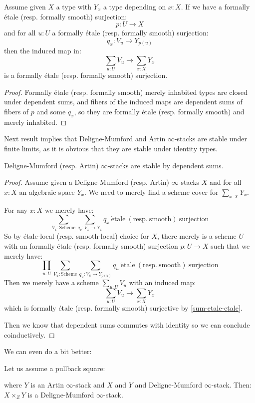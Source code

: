 \begin{lemma}\label{sum-etale-etale}
Assume given $X$ a type with $Y_x$ a type depending on $x:X$. If we have a formally étale (resp. formally smooth) surjection:
\[p:U\to X\]
and for all $u:U$ a formally étale (resp. formally smooth) surjection:
\[q_x : V_u \to Y_{p(u)}\]
then the induced map in:
\[\sum_{u:U} V_u \to \sum_{x:X}Y_x\]
is a formally étale (resp. formally smooth) surjection.
\end{lemma}

\begin{proof}
Formally étale (resp. formally smooth) merely inhabited types are closed under dependent sums, and fibers of the induced maps are dependent sums of fibers of $p$ and some $q_x$, so they are formally étale (resp. formally smooth) and merely inhabited.
\end{proof}

Next result implies that Deligne-Mumford and Artin $\infty$-stacks are stable under finite limits, as it is obvious that they are stable under identity types.

\begin{proposition}\label{infty-stacks-sum}
Deligne-Mumford (resp. Artin) $\infty$-stacks are stable by dependent sums.
\end{proposition}

\begin{proof}
Assume given a Deligne-Mumford (resp. Artin) $\infty$-stacks $X$ and for all $x:X$ an algebraic space $Y_x$. We need to merely find a scheme-cover for $\sum_{x:X} Y_x$. 

For any $x:X$ we merely have:
\[ \sum_{V_x:\mathrm{Scheme}} \sum_{q_x: V_x \to Y_x} q_x\ \mathrm{\acute{e}tale\ (resp.\ smooth)\ surjection}\]
So by étale-local (resp. smooth-local) choice for $X$, there merely is a scheme $U$ with an formally étale (resp. formally smooth) surjection $p: U \to X$ such that we merely have:
\[\prod_{u:U} \sum_{V_u:\mathrm{Scheme}} \sum_{q_u: V_u \to Y_{p(u)}} q_u\ \mathrm{\acute{e}tale\ (resp.\ smooth)\ surjection}\]
Then we merely have a scheme $\sum_{u:U}V_u$ with an induced map:
\[\sum_{u:U}V_u \to \sum_{x:X} Y_x\]
which is formally étale (resp. formally smooth) surjective by \cref{sum-etale-etale}.

Then we know that dependent sums commutes with identity so we can conclude coinductively.
\end{proof}

We can even do a bit better:

\begin{lemma}
Let us assume a pullback square:
 \begin{center}
  \end{center}
 where $Y$ is an Artin $\infty$-stack and $X$ and $Y$ and Deligne-Mumford $\infty$-stack. Then:
 $X\times_ZY$ is a Deligne-Mumford $\infty$-stack.
\end{lemma}

